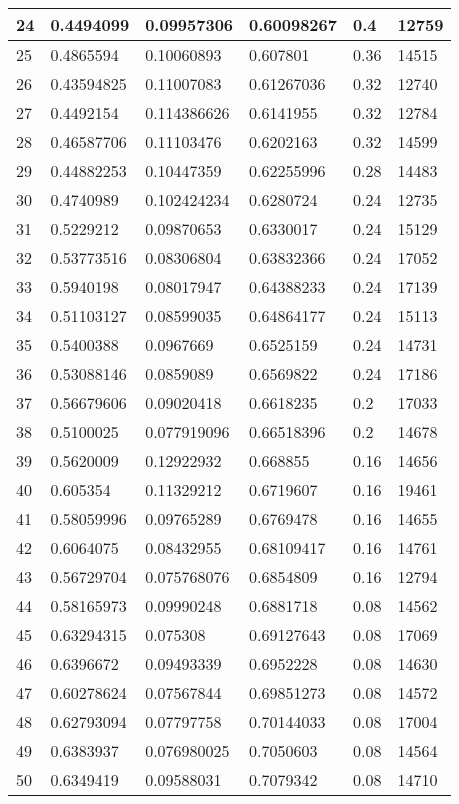 \begin{longtable}{|l|l|l|l|l|l|}
24 & 0.4494099 & 0.09957306 & 0.60098267 & 0.4 & 12759 \\ \hline 
25 & 0.4865594 & 0.10060893 & 0.607801 & 0.36 & 14515 \\ \hline 
26 & 0.43594825 & 0.11007083 & 0.61267036 & 0.32 & 12740 \\ \hline 
27 & 0.4492154 & 0.114386626 & 0.6141955 & 0.32 & 12784 \\ \hline 
28 & 0.46587706 & 0.11103476 & 0.6202163 & 0.32 & 14599 \\ \hline 
29 & 0.44882253 & 0.10447359 & 0.62255996 & 0.28 & 14483 \\ \hline 
30 & 0.4740989 & 0.102424234 & 0.6280724 & 0.24 & 12735 \\ \hline 
31 & 0.5229212 & 0.09870653 & 0.6330017 & 0.24 & 15129 \\ \hline 
32 & 0.53773516 & 0.08306804 & 0.63832366 & 0.24 & 17052 \\ \hline 
33 & 0.5940198 & 0.08017947 & 0.64388233 & 0.24 & 17139 \\ \hline 
34 & 0.51103127 & 0.08599035 & 0.64864177 & 0.24 & 15113 \\ \hline 
35 & 0.5400388 & 0.0967669 & 0.6525159 & 0.24 & 14731 \\ \hline 
36 & 0.53088146 & 0.0859089 & 0.6569822 & 0.24 & 17186 \\ \hline 
37 & 0.56679606 & 0.09020418 & 0.6618235 & 0.2 & 17033 \\ \hline 
38 & 0.5100025 & 0.077919096 & 0.66518396 & 0.2 & 14678 \\ \hline 
39 & 0.5620009 & 0.12922932 & 0.668855 & 0.16 & 14656 \\ \hline 
40 & 0.605354 & 0.11329212 & 0.6719607 & 0.16 & 19461 \\ \hline 
41 & 0.58059996 & 0.09765289 & 0.6769478 & 0.16 & 14655 \\ \hline 
42 & 0.6064075 & 0.08432955 & 0.68109417 & 0.16 & 14761 \\ \hline 
43 & 0.56729704 & 0.075768076 & 0.6854809 & 0.16 & 12794 \\ \hline 
44 & 0.58165973 & 0.09990248 & 0.6881718 & 0.08 & 14562 \\ \hline 
45 & 0.63294315 & 0.075308 & 0.69127643 & 0.08 & 17069 \\ \hline 
46 & 0.6396672 & 0.09493339 & 0.6952228 & 0.08 & 14630 \\ \hline 
47 & 0.60278624 & 0.07567844 & 0.69851273 & 0.08 & 14572 \\ \hline 
48 & 0.62793094 & 0.07797758 & 0.70144033 & 0.08 & 17004 \\ \hline 
49 & 0.6383937 & 0.076980025 & 0.7050603 & 0.08 & 14564 \\ \hline 
50 & 0.6349419 & 0.09588031 & 0.7079342 & 0.08 & 14710 \\ \hline 
\end{longtable}